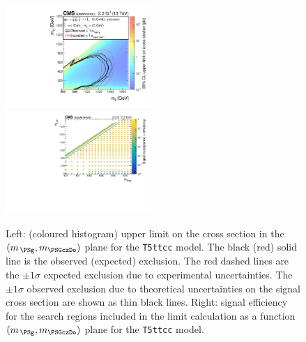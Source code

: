 \clearpage
\begin{figure}[!h]
  \begin{center}
    \includegraphics[width=0.49\textwidth]{RA1T5ttccXSEC_aux} \, 
    \includegraphics[width=0.49\textwidth]{T5ttcc_merging_4_cats_aux} \,     
  \end{center}
  \caption{Left: (coloured histogram) upper limit on the cross section in the $(m_{\,\PSg}, m_{\PSGczDo})$ plane for the \texttt{T5ttcc} model. 
  The black (red) solid line is the observed (expected) exclusion. The red dashed lines are the $\pm1\sigma$ expected exclusion due to experimental uncertainties. 
  The $\pm1\sigma$ observed exclusion due to theoretical uncertainties on the signal cross section are shown as thin black lines. 
  Right: signal efficiency for the search regions included in the limit calculation as a function $(m_{\,\PSg}, m_{\PSGczDo})$ plane for the \texttt{T5ttcc} model. 
  \label{fig:T5ttcc_excl}}
\end{figure}


